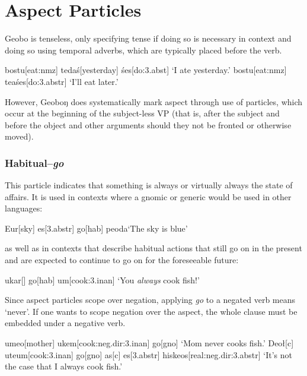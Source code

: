 \documentclass[a4paper,11pt,oneside,openany]{memoir}
\begin{document}

\section{Aspect Particles}

Geobo{\engma} is tenseless, only specifying tense if doing so is necessary in context and doing so using temporal adverbs, which are typically placed before the verb.

\pex 
\a 
\begingl 
bostu[eat:{\sc nmz}]
te\vd[1]
da\'s[yesterday]
\'ses[do:{\sc 3.abst}]
\glft `I ate yesterday.'
\endgl
\a 
\begingl 
bostu[eat:{\sc nmz}]
te\vd[1]
\vs a\vl\vn[someday]
\'ses[do:{\sc 3.abstr}]
\glft `I'll eat later.'
\endgl 
\xe

However, Geoboŋ does systematically mark aspect through use of particles, which occur at the beginning of the subject-less VP (that is, after the subject and before the object and other arguments should they not be fronted or otherwise moved).


\subsubsection{Habitual--\textit{go}}

This particle indicates that something is always or virtually always the state of affairs. It is used in contexts where a gnomic or generic would be used in other languages:

\ex
\begingl
Eu\engma r[sky]
es[\sc 3.abstr]
go[\sc hab]
peoda
\glft `The sky is blue'
\endgl
\xe

as well as in contexts that describe habitual actions that still go on in the present and are expected to continue to go on for the foreseeable future:

\ex 
\begingl
\Engma u\vz[fish]
kar[]
go[\sc hab]
\vr um[cook:{\sc 3.inan}]
\nogloss{!}
\glft `You \emph{always} cook fish!'
\endgl
\xe

Since aspect particles scope over negation, applying \textit{go} to a negated verb means `never'. If one wants to scope negation over the aspect, the whole clause must be embedded under a negative verb.

\pex 
\a 
\begingl
\Engma u\vz[fish]
meo[mother]
\vr ukem[cook:{\sc neg.dir:3.inan}]
go[\sc gno]
\glft `Mom never cooks fish.'
\endgl
\a 
\begingl
Deo\l[\sc c]
\engma u\vz[fish]
te\vd[\sc 1]
\vr um[cook:{\sc 3.inan}]
go[\sc gno]
\nogloss{,}
as[\sc c]
es[\sc 3.abstr]
his\engma keos[real:{\sc neg.dir:3.abstr}]
\glft `It's not the case that I always cook fish.'
\endgl
\xe
\end{document}
